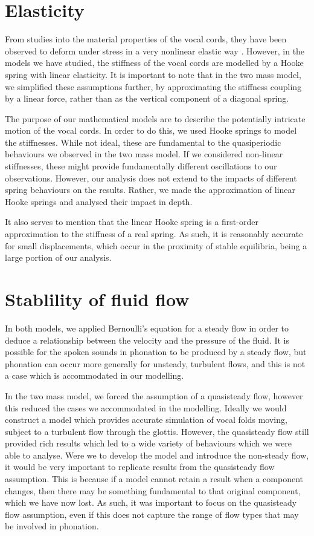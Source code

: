 \documentclass{report}
\begin{document}

\section{Elasticity}

From studies into the material properties of the vocal cords,
they have been observed to deform under stress in a very nonlinear elastic way \cite{alipour_2012}.
However, in the models we have studied,
the stiffness of the vocal cords are modelled by a Hooke spring with linear elasticity.
It is important to note that in the two mass model,
we simplified these assumptions further,
by approximating the stiffness coupling by a linear force,
rather than as the vertical component of a diagonal spring.

The purpose of our mathematical models are to describe the potentially intricate motion of the vocal cords.
In order to do this,
we used Hooke springs to model the stiffnesses.
While not ideal, these are fundamental to the quasiperiodic behaviours we observed in the two mass model.
If we considered non-linear stiffnesses,
these might provide fundamentally different oscillations to our observations.
However, our analysis does not extend to the impacts of different spring behaviours on the results.
Rather, we made the approximation of linear Hooke springs and analysed their impact in depth.

It also serves to mention that the linear Hooke spring is a first-order approximation to the stiffness of a real spring.
As such, it is reasonably accurate for small displacements,
which occur in the proximity of stable equilibria,
being a large portion of our analysis.

\section{Stablility of fluid flow}

In both models,
we applied Bernoulli's equation for a steady flow in order to deduce a relationship between the velocity and the pressure of the fluid.
It is possible for the spoken sounds in phonation to be produced by a steady flow,
but phonation can occur more generally for unsteady, turbulent flows,
and this is not a case which is accommodated in our modelling.

In the two mass model,
we forced the assumption of a quasisteady flow,
however this reduced the cases we accommodated in the modelling.
Ideally we would construct a model which provides accurate simulation of vocal folds moving, subject to a turbulent flow through the glottis.
However, the quasisteady flow still provided rich results which led to a wide variety of behaviours which we were able to analyse.
Were we to develop the model and introduce the non-steady flow,
it would be very important to replicate results from the quasisteady flow assumption.
This is because if a model cannot retain a result when a component changes,
then there may be something fundamental to that original component,
which we have now lost.
As such,
it was important to focus on the quasisteady flow assumption,
even if this does not capture the range of flow types that may be involved in phonation.
\end{document}

